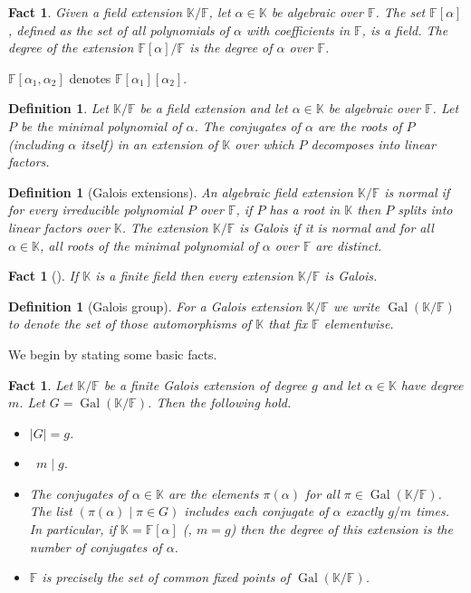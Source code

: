 \documentclass{toc}
\newtheorem{define}[theorem]{Definition}
\newtheorem{fact.}[theorem]{Fact}
\newcommand\F{{\mathbb{F}}}
\newcommand\K{{\mathbb{K}}}
\DeclareMathOperator{\Gal}{Gal}  %
\begin{document}
\begin{fact.}
Given a field extension $\K/\F$, 
let $\alpha \in \K$ be algebraic over $\F$.
The set $\F[\alpha]$, defined as the set of all polynomials of
$\alpha$ with coefficients in $\F$, is a field.
The degree of the extension $\F[\alpha]/\F$
is the degree of $\alpha$ over $\F$.
\end{fact.}
%
%
$\F[\alpha_1,\alpha_2]$ denotes $\F[\alpha_1][\alpha_2]$. 
\begin{define}
Let $\K/\F$ be a field extension 
and let $\alpha \in \K$ be algebraic over $\F$.
Let $P$ be the minimal polynomial of $\alpha$.  
The \emph{conjugates} of $\alpha$ are the roots of $P$
(including $\alpha$ itself)
%
in an extension of $\K$ over which $P$ decomposes into linear factors. %
\end{define}

\begin{define}[Galois extensions]
  An algebraic field extension $\K/\F$ is \emph{normal} if for
  every irreducible polynomial $P$ over $\F$, if $P$ has a root
  in $\K$ then $P$ splits into linear factors over $\K$.
  The extension $\K/\F$ is \emph{Galois} if it is normal
  and for all $\alpha\in\K$, all roots of the minimal polynomial
  of $\alpha$ over $\F$ are distinct.
\end{define}

\begin{fact.}[{\cite[Ch. V, Thm. 5.5]{lang}}]
If $\K$ is a finite field then every extension $\K/\F$ is Galois.
\end{fact.}
%
%

\begin{define}[Galois group]
For a Galois extension $\K/\F$ we write $\Gal(\K/\F)$
to denote the set of those automorphisms of $\K$ that
fix $\F$ elementwise.
\end{define}
  
We begin by stating some basic facts.  

\begin{fact.}   \label{fact:galois-extension-facts}
Let $\K/\F$ be a finite Galois extension of degree $g$
and let $\alpha\in \K$ have degree $m$.  Let $G=\Gal(\K/\F)$.
Then the following hold.
\begin{itemize}
\item[(i)] $|G|=g$.
\item[(ii)] \ $m\mid g$.
\item[(iii)] The conjugates of $\alpha \in \K$ are the elements
  $\pi(\alpha)$ for all $\pi \in \Gal(\K/\F)$.  The
  list $(\pi(\alpha)\mid \pi\in G)$ includes each
  conjugate of $\alpha$ exactly $g/m$ times.
  In particular, if
  $\K = \F[\alpha]$ (\ie, $m=g$) then the degree of
  this extension is the number of conjugates of $\alpha$.
\item[(iv)] $\F$ is precisely the set of common fixed points of
$\Gal(\K/\F)$.
\end{itemize}
\end{fact.}
\end{document}
